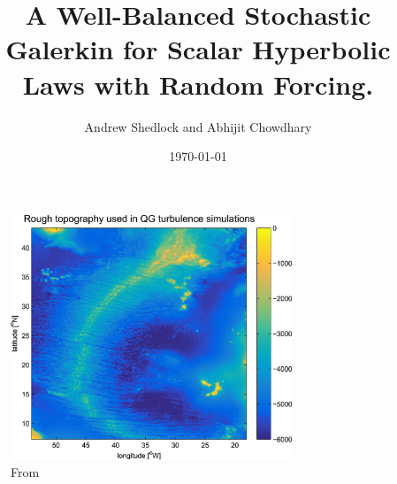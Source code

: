 \documentclass[
    pdf,
    11pt,
    xcolor={svgnames},
  ]{beamer}
\title[WBSG for Random Scalar Hyperbolic Laws]{%
  A Well-Balanced Stochastic Galerkin for Scalar Hyperbolic Laws with Random Forcing.
}
\author[Chowdhary, Shedlock]{%
  Andrew Shedlock and Abhijit Chowdhary
}
\institute[NCSU]{
  Department of Mathematics \\
  North Carolina State University
}
\date[MA788 NCSU]{\today}
\begin{document}
\frame{ \titlepage }

\begin{frame}
\begin{figure}
\centering
\includegraphics[width=0.75\textwidth]{slides/bottom_topography.jpg}
\caption{From \cite{Trossman2017}}
\end{figure}
\end{frame}
\end{document}
